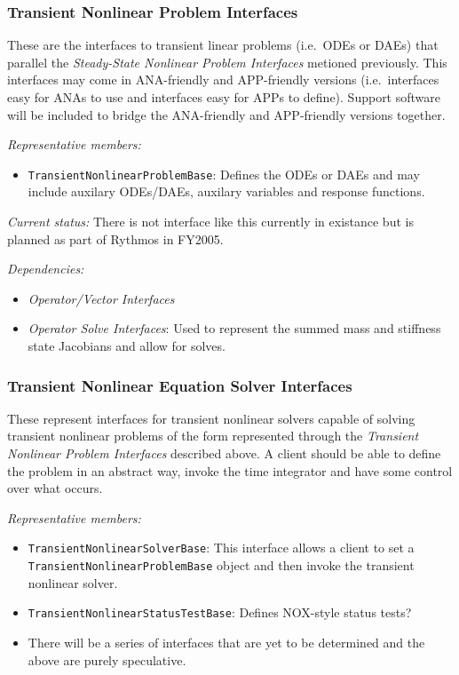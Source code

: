 \documentclass[pdf,ps2pdf,11pt]{SANDreport}
\begin{document}
%
\subsubsection{Transient Nonlinear Problem Interfaces}
%

These are the interfaces to transient linear problems (i.e.\ ODEs or DAEs)
that parallel the {}\textit{Steady-State Nonlinear Problem Interfaces}
metioned previously.  This interfaces may come in ANA-friendly and
APP-friendly versions (i.e.\ interfaces easy for ANAs to use and interfaces
easy for APPs to define).  Support software will be included to bridge the
ANA-friendly and APP-friendly versions together.

{}\textit{Representative members:}
\begin{itemize}
%
{}\item {}\texttt{TransientNonlinearProblemBase}: Defines the ODEs or DAEs and
may include auxilary ODEs/DAEs, auxilary variables and response functions.
%
\end{itemize}

{}\textit{Current status:} There is not interface like this currently in
existance but is planned as part of Rythmos in FY2005.

{}\textit{Dependencies:}
\begin{itemize}
\item {}\textit{Operator/Vector Interfaces}
\item {}\textit{Operator Solve Interfaces}: Used to represent the summed
mass and stiffness state Jacobians and allow for solves.
\end{itemize}

%
\subsubsection{Transient Nonlinear Equation Solver Interfaces}
%

These represent interfaces for transient nonlinear solvers capable of solving
transient nonlinear problems of the form represented through the
{}\textit{Transient Nonlinear Problem Interfaces} described above.  A client
should be able to define the problem in an abstract way, invoke the time
integrator and have some control over what occurs.

{}\textit{Representative members:}
\begin{itemize}
%
{}\item {}\texttt{TransientNonlinearSolverBase}: This interface allows a client to
set a {}\texttt{TransientNonlinearProblemBase} object and then invoke the
transient nonlinear solver.
%
{}\item {}\texttt{TransientNonlinearStatusTestBase}: Defines NOX-style status tests?
%
{}\item There will be a series of interfaces that are yet to be determined and
the above are purely speculative.
%
\end{itemize}
\end{document}

